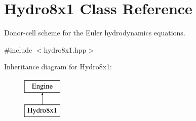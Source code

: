 \hypertarget{classHydro8x1}{}\section{Hydro8x1 Class Reference}
\label{classHydro8x1}


Donor-\/cell scheme for the Euler hydrodynamics equations.  




{\ttfamily \#include $<$hydro8x1.\+hpp$>$}

Inheritance diagram for Hydro8x1\+:\begin{figure}[H]
\begin{center}
\leavevmode
\includegraphics[height=2.000000cm]{classHydro8x1}
\end{center}
\end{figure}
